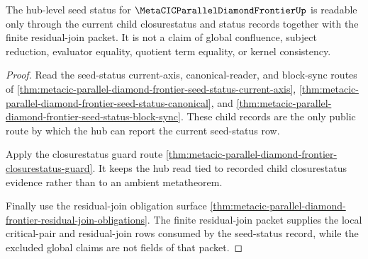 \begin{theorem}
\label{thm:metacic-parallel-diamond-frontier-seed-status-child-current}
The hub-level seed status for $\MetaCICParallelDiamondFrontierUp$ is readable only through the current child closurestatus and status records together with the finite residual-join packet. It is not a claim of global confluence, subject reduction, evaluator equality, quotient term equality, or kernel consistency.
\end{theorem}
\begin{proof}
Read the seed-status current-axis, canonical-reader, and block-sync routes of \autoref{thm:metacic-parallel-diamond-frontier-seed-status-current-axis}, \autoref{thm:metacic-parallel-diamond-frontier-seed-status-canonical}, and \autoref{thm:metacic-parallel-diamond-frontier-seed-status-block-sync}. These child records are the only public route by which the hub can report the current seed-status row.

Apply the closurestatus guard route \autoref{thm:metacic-parallel-diamond-frontier-closurestatus-guard}. It keeps the hub read tied to recorded child closurestatus evidence rather than to an ambient metatheorem.

Finally use the residual-join obligation surface \autoref{thm:metacic-parallel-diamond-frontier-residual-join-obligations}. The finite residual-join packet supplies the local critical-pair and residual-join rows consumed by the seed-status record, while the excluded global claims are not fields of that packet.
\end{proof}
